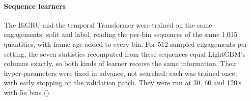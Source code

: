 \paragraph{Sequence learners}
The BiGRU and the temporal Transformer were trained on the same engagements, split and label, reading the
per-bin sequences of the same 1,015 quantities, with frame age added to every bin. For 512 sampled
engagements per setting, the seven statistics recomputed from these sequences equal LightGBM's columns
exactly, so both kinds of learner receive the same information. Their hyper-parameters were fixed in
advance, not searched; each was trained once, with early stopping on the validation patch. They were run
at 30, 60 and 120\,s with 5\,s bins ().


